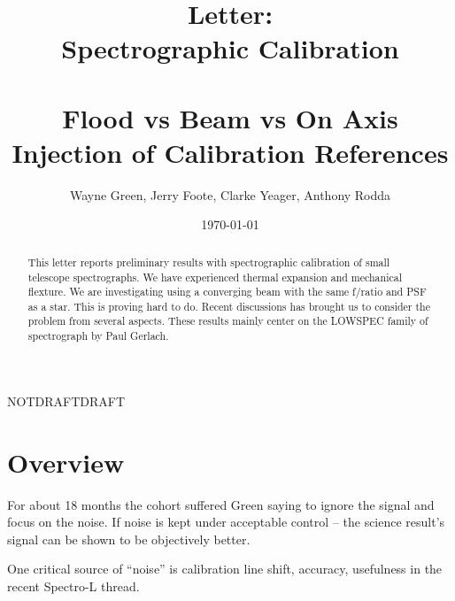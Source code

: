 \documentclass[letter,11pt,oneside]{article}
\def\documentisdraft{NOTDRAFT}
\def\drafttest{DRAFT}
\begin{document}


\title{Letter:\\
Spectrographic Calibration\\
~ \\
{\large Flood vs Beam vs On Axis \\
Injection of Calibration References}}
\author{Wayne Green, Jerry Foote, Clarke Yeager, Anthony Rodda}
\date{\today}
\maketitle

\begin{abstract}
This letter reports preliminary results with spectrographic
calibration of small telescope spectrographs. We have experienced
thermal expansion and mechanical flexture. We are investigating using
a converging beam with the same f/ratio and PSF as a star. This is
proving hard to do. Recent discussions has brought us to consider the
problem from several aspects. These results mainly center on the
LOWSPEC family of spectrograph by Paul Gerlach.

\end{abstract}

 
\tableofcontents
\listoftables
\newpage


\setcounter{section}{0}

\ifx\documentisdraft\drafttest
\linenumbers    %
\fi

\section{Overview}

For about 18 months the cohort suffered Green saying to ignore the
signal and focus on the noise. If noise is kept under acceptable
control -- the science result's signal can be shown to be
objectively better. 

One critical source of ``noise'' is calibration line shift, accuracy,
usefulness in the recent Spectro-L thread.
\end{document}
